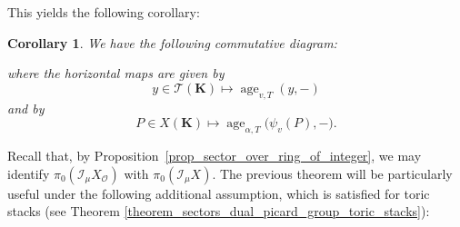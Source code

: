 \documentclass{proc-l}
\newcommand{\Z}{\mathbf{Z}}
\newcommand{\K}{\mathbf{K}}
\newcommand{\Q}{\mathbf{Q}}
\newcommand{\F}{\mathbf{F}}
\newcommand{\I}{\mathcal{I}}
\DeclareMathOperator{\Spec}{Spec}
\DeclareMathOperator{\grp}{grp}
\DeclareMathOperator{\Hom}{Hom}
\DeclareMathOperator{\age}{age}
\newcommand{\stackT}{\mathcal{T}}
\newcommand{\sheafI}{\mathcal{I}}
\newcommand{\sheafO}{\mathcal{O}}
\newcommand{\sector}{\pi_0(\sheafI_{\mu} X)}
\newtheorem{cor}[theorem]{Corollary}
\theoremstyle{definition}
\theoremstyle{remark}
\numberwithin{equation}{section}
\begin{document}
This yields the following corollary:

\begin{cor}
We have the following commutative diagram:
\begin{center}
\end{center}
where the horizontal maps are given by
\[
y \in \stackT(\K) \longmapsto \age_{v,T}(y,-)
\]
and by
\[
P \in X(\K) \longmapsto \age_{\alpha,T}\bigl(\psi_v(P),-\bigr).
\]
\end{cor}






Recall that, by Proposition~\ref{prop_sector_over_ring_of_integer}, we may identify $\pi_0(\I_{\mu} X_{\sheafO})$ with $\sector$. The previous theorem will be particularly useful under the following additional assumption, which is satisfied for toric stacks (see Theorem \ref{theorem_sectors_dual_picard_group_toric_stacks}):
\end{document}
